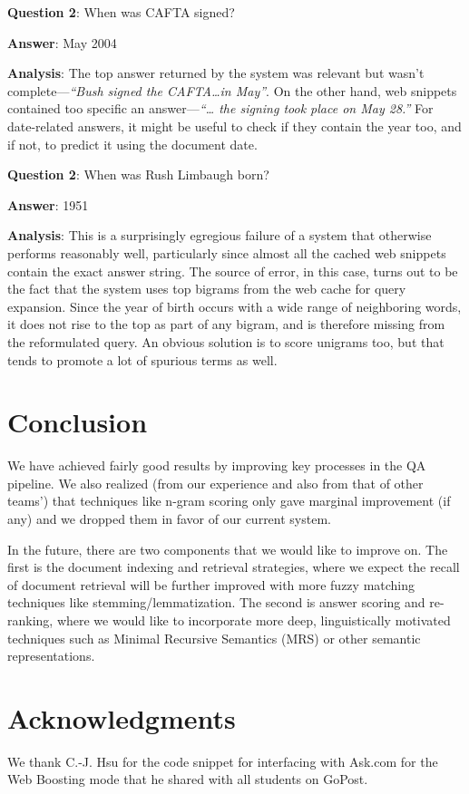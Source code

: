 \documentclass[11pt]{article}
\begin{document}
\noindent \textbf{Question 2}: When was CAFTA signed? 

\noindent \textbf{Answer}: May 2004

\noindent \textbf{Analysis}: The top answer returned by the system was relevant but wasn't complete---\emph{``Bush signed the CAFTA\ldots{}in May''}. On the other hand, web snippets contained too specific an answer---\emph{``\ldots{} the signing took place on May 28.''} For date-related answers, it might be useful to check if they contain the year too, and if not, to predict it using the document date.


\noindent \textbf{Question 2}: When was Rush Limbaugh born?

\noindent \textbf{Answer}: 1951

\noindent \textbf{Analysis}:
This is a surprisingly egregious failure of a system that otherwise performs reasonably well, particularly since almost all the cached web snippets contain the exact answer string. The source of error, in this case, turns out to be the fact that the system uses top bigrams from the web cache for query expansion. Since the year of birth occurs with a wide range of neighboring words, it does not rise to the top as part of any bigram, and is therefore missing from the reformulated query. An obvious solution is to score unigrams too, but that tends to promote a lot of spurious terms as well.

\section{Conclusion}
We have achieved fairly good results by improving key processes in the QA pipeline. We also realized (from our experience and also from that of other teams') that techniques like n-gram scoring only gave marginal improvement (if any) and we dropped them in favor of our current system. 

In the future, there are two components that we would like to improve on. The first is the document indexing and retrieval strategies, where we expect the recall of document retrieval will be further improved with more fuzzy matching techniques like stemming/lemmatization. The second is answer scoring and re-ranking, where we would like to incorporate more deep, linguistically motivated techniques such as Minimal Recursive Semantics (MRS) or other semantic representations.



\section*{Acknowledgments}
We thank C.-J. Hsu for the code snippet for interfacing with Ask.com for the Web Boosting mode that he shared with all students on GoPost.

\printbibliography
\end{document}
